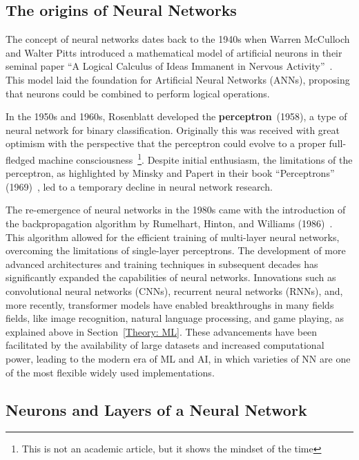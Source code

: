 \documentclass[a4paper, 11pt]{report}
\begin{document}
\subsection{The origins of Neural Networks}
The concept of neural networks dates back to the 1940s when Warren McCulloch and Walter Pitts introduced a mathematical model of artificial neurons in their seminal paper ``A Logical Calculus of Ideas Immanent in Nervous Activity''~\cite{McCulloch1943_Calculus_nervous}. This model laid the foundation for Artificial Neural Networks (ANNs), proposing that neurons could be combined to perform logical operations.

In the 1950s and 1960s, Rosenblatt developed the \textbf{perceptron}~\cite{Rosenblatt1958_Perceptron}(1958), a type of neural network for binary classification. Originally this was received with great optimism with the perspective that the perceptron could evolve to a proper full-fledged machine consciousness~\cite{NYT1958}\footnote{This is not an academic article, but it shows the mindset of the time}. Despite initial enthusiasm, the limitations of the perceptron, as highlighted by Minsky and Papert in their book ``Perceptrons'' (1969)~\cite{Minsky1969_Perceptrons}, led to a temporary decline in neural network research.

The re-emergence of neural networks in the 1980s came with the introduction of the backpropagation algorithm by Rumelhart, Hinton, and Williams (1986)~\cite{Rumelhart1986_Backpropagation}. This algorithm allowed for the efficient training of multi-layer neural networks, overcoming the limitations of single-layer perceptrons. The development of more advanced architectures and training techniques in subsequent decades has significantly expanded the capabilities of neural networks. Innovations such as convolutional neural networks (CNNs), recurrent neural networks (RNNs), and, more recently, transformer models have enabled breakthroughs in many fields fields, like image recognition, natural language processing, and game playing, as explained above in Section~\ref{Theory: ML}. These advancements have been facilitated by the availability of large datasets and increased computational power, leading to the modern era of ML and AI, in which varieties of NN are one of the most flexible widely used implementations.

\subsection{Neurons and Layers of a Neural Network}
\end{document}

